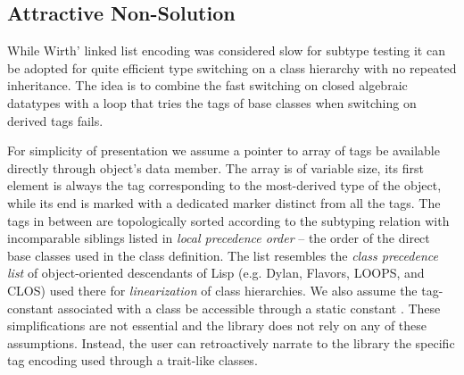 \subsection{Attractive Non-Solution}
\label{sec:cotc}



While Wirth' linked list encoding was considered slow for subtype testing it can 
be adopted for quite efficient type switching on a class hierarchy with no 
repeated inheritance. The idea is to combine the fast switching on closed 
algebraic datatypes with a loop that tries the tags of base classes when 
switching on derived tags fails.


For simplicity of presentation we assume a pointer to array of tags be available 
directly through object's  data member. The array is of 
variable size, its first element is always the tag corresponding to the 
most-derived type of the object, while its end is marked with a dedicated 
 marker distinct from all the tags. The tags in between are 
topologically sorted according to the subtyping relation with incomparable 
siblings listed in \emph{local precedence order} -- the order of the direct base 
classes used in the class definition. The list resembles the \emph{class 
precedence list} of object-oriented descendants of Lisp (e.g. Dylan, Flavors, 
LOOPS, and CLOS) used there for \emph{linearization} of class hierarchies.
We also assume the tag-constant associated with a class 
 be accessible through a static constant . These 
simplifications are not essential and the library does not rely on any of these 
assumptions. Instead, the user can retroactively narrate to the library the 
specific tag encoding used through a trait-like classes.


